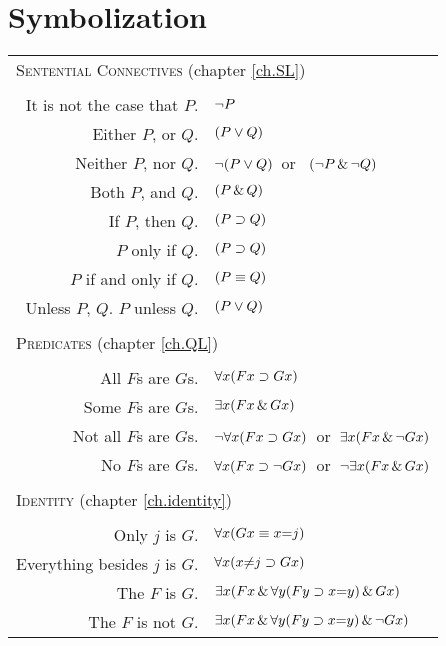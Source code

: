 \section*{Symbolization}
\label{app.symbolization}
\begin{tabular*}{\textwidth}{rl}
\multicolumn{2}{l}{\textsc{Sentential Connectives} (chapter \ref{ch.SL})}\\ \\
It is not the case that $P$. & $\neg P$\\
Either $P$, or $Q$. & $(P \vee Q)$\\
Neither $P$, nor $Q$. & $\neg(P \vee Q)$\ or \ $(\neg P \,\&\, \neg Q)$\\
Both $P$, and $Q$. & $(P \,\&\, Q)$\\
If $P$, then $Q$. & $(P \supset Q)$\\
$P$ only if $Q$. & $(P \supset Q)$\\
$P$ if and only if $Q$. & $(P \equiv Q)$\\
Unless $P$, $Q$. $P$ unless $Q$. & $(P \vee Q)$\\
\\
\multicolumn{2}{l}{\label{SymbolizingPredicates}\textsc{Predicates} (chapter \ref{ch.QL})}\\ \\
All $F$s are $G$s. & $\forall x(Fx \supset Gx)$\\
Some $F$s are $G$s. & $\exists x(Fx \,\&\, Gx)$\\
Not all $F$s are $G$s. & $\neg\forall x(Fx \supset Gx)$\ or\ $\exists x(Fx \,\&\, \neg Gx)$\\
No $F$s are $G$s. & $\forall x(Fx \supset\neg Gx)$\ or\ $\neg\exists x(Fx \,\&\, Gx)$\\
\\
\multicolumn{2}{l}{\textsc{Identity} (chapter \ref{ch.identity})}\\ \\
Only $j$ is $G$. & $\forall x(Gx \equiv x{=}j)$\\
Everything besides $j$ is $G$. & $\forall x(x {\neq} j \supset Gx)$\\
The $F$ is $G$. & $\exists x(Fx \,\&\, \forall y(Fy \supset x{=}y) \,\&\, Gx)$\\
The $F$ is not $G$. & $\exists x(Fx \,\&\, \forall y(Fy \supset x{=}y) \,\&\, \neg Gx)$\\
%
\end{tabular*}


